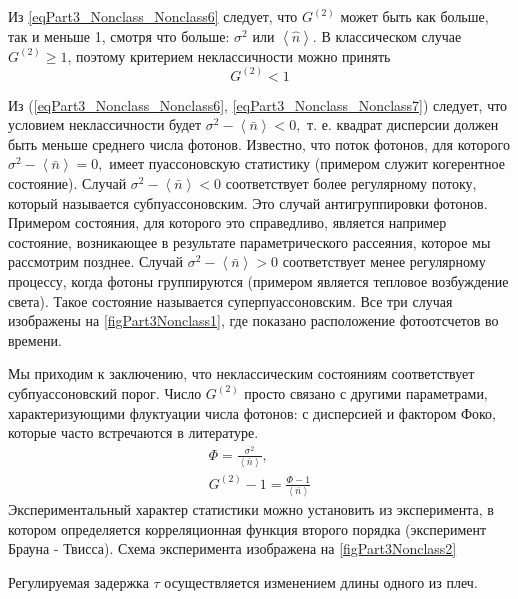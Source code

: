 Из \eqref{eqPart3_Nonclass_Nonclass6} следует, что $G^{(2)}$ может
быть как больше, так и меньше 1, смотря что больше: $\sigma^2$ или
$\left<\hat{n}\right>$. В классическом случае $G^{(2)} \ge 1$, поэтому
критерием неклассичности можно принять 
\begin{equation}
G^{(2)} < 1
\label{eqPart3_Nonclass_Nonclass7}
\end{equation}

Из (\ref{eqPart3_Nonclass_Nonclass6},
\ref{eqPart3_Nonclass_Nonclass7}) следует, что условием неклассичности
будет 
\(
\sigma^2 - \left<\bar{n}\right> < 0,
\) 
т. е. квадрат дисперсии должен быть меньше среднего числа
фотонов. 
Известно, что поток фотонов, для которого
\(
\sigma^2 - \left<\bar{n}\right> = 0,
\)
имеет пуассоновскую статистику (примером служит когерентное
состояние). Случай 
\(
\sigma^2 - \left<\bar{n}\right> < 0
\)
соответствует более регулярному потоку, который называется
субпуассоновским. Это случай антигруппировки фотонов. Примером
состояния, для которого это справедливо, является например состояние,
возникающее в результате параметрического рассеяния, которое мы
рассмотрим позднее. Случай
\(
\sigma^2 - \left<\bar{n}\right> > 0
\)
соответствует менее регулярному процессу, когда фотоны группируются
(примером является тепловое возбуждение света). Такое состояние
называется суперпуассоновским. Все три случая изображены на
\autoref{figPart3Nonclass1}, где показано расположение фотоотсчетов
во времени.



Мы приходим к заключению, что неклассическим состояниям соответствует
субпуассоновский порог. Число $G^{(2)}$ просто связано с другими
параметрами, характеризующими флуктуации числа фотонов: с дисперсией и
фактором Фоко, которые часто встречаются в литературе.
\begin{eqnarray}
\Phi  = \frac{\sigma^2}{\left<\bar{n}\right>},
\nonumber \\
G^{(2)} - 1 = \frac{\Phi - 1}{\left<\bar{n}\right>}
\nonumber
\end{eqnarray}
Экспериментальный характер статистики можно установить из эксперимента,
в котором определяется корреляционная функция второго порядка
(эксперимент Брауна - Твисса). Схема эксперимента изображена на
\autoref{figPart3Nonclass2} 



Регулируемая задержка $\tau$ осуществляется изменением длины одного из
плеч.

